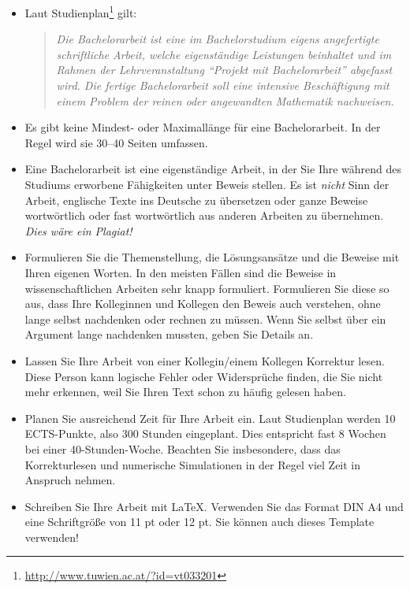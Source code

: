 {\color{change}
\begin{itemize}

\item Laut Studienplan\footnote{\href{http://www.tuwien.ac.at/?id=vt033201}{\ttfamily http://www.tuwien.ac.at/?id=vt033201}}
gilt:
\begin{quote}\itshape
Die Bachelorarbeit ist eine im Bachelorstudium eigens angefertigte schriftliche Arbeit, welche eigenständige Leistungen beinhaltet und im Rahmen der Lehrveranstaltung "`Projekt mit Bachelorarbeit"' abgefasst wird. Die fertige Bachelorarbeit soll eine intensive Beschäftigung mit einem Problem der reinen oder angewandten Mathematik nachweisen.
\end{quote}

\item Es gibt keine Mindest- oder Maximallänge für eine Bachelorarbeit. In der Regel wird sie 30--40 Seiten umfassen.

\item Eine Bachelorarbeit ist eine eigenständige Arbeit, in der Sie Ihre während
des Studiums erworbene Fähigkeiten unter Beweis stellen. Es ist {\em nicht}
Sinn der Arbeit, englische Texte ins Deutsche zu übersetzen oder ganze
Beweise wortwörtlich oder fast wortwörtlich 
aus anderen Arbeiten zu übernehmen. {\em Dies wäre ein Plagiat!} 

\item Formulieren Sie die Themenstellung, die Lösungsansätze und die Beweise 
mit Ihren eigenen Worten. In den meisten Fällen sind die Beweise
in wissenschaftlichen Arbeiten sehr knapp formuliert. Formulieren Sie diese so
aus, dass Ihre Kolleginnen und Kollegen den Beweis auch verstehen, ohne lange selbst nachdenken
oder rechnen zu müssen. Wenn Sie selbst über ein Argument lange nachdenken mussten,
geben Sie Details an.

\item Lassen Sie Ihre Arbeit von einer Kollegin/einem Kollegen Korrektur lesen.
Diese Person kann logische Fehler oder Widersprüche finden, die Sie nicht mehr
erkennen, weil Sie Ihren Text schon zu häufig gelesen haben.

\item Planen Sie ausreichend Zeit für Ihre Arbeit ein. Laut Studienplan
werden 10 ECTS-Punkte, also 300 Stunden eingeplant. Dies entspricht fast 
8 Wochen bei einer 40-Stunden-Woche. Beachten Sie insbesondere, dass das
Korrekturlesen und numerische Simulationen in der Regel viel Zeit in
Anspruch nehmen.

\item Schreiben Sie Ihre Arbeit mit \LaTeX. Verwenden Sie das Format DIN A4 und eine Schriftgröße von 11 pt
oder 12 pt. Sie können auch dieses Template verwenden!

\end{itemize}
}

